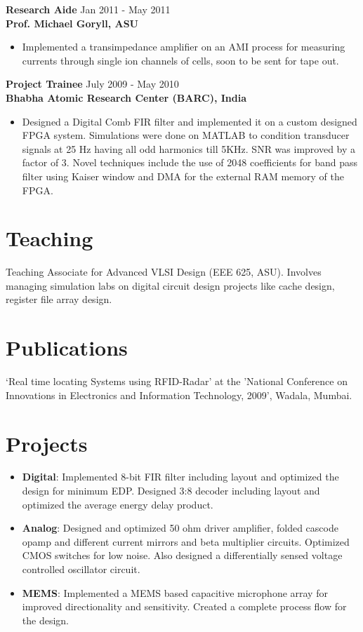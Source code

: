 \documentclass[margin]{res}
\begin{document}
\begin{resume}
{\bf Research Aide} \hfill Jan 2011 - May 2011\\
{\bf Prof. Michael Goryll, ASU}
\begin{itemize}
	\item Implemented a transimpedance amplifier on an AMI process for measuring currents through single ion channels of cells, soon to be sent for tape out.
\end{itemize}
 
{\bf Project Trainee} \hfill July 2009 - May 2010\\
{\bf Bhabha Atomic Research Center (BARC), India}
\begin{itemize} 
	\item Designed a Digital Comb FIR filter and implemented it on a custom designed FPGA system. Simulations were done on MATLAB to condition transducer signals at 25 Hz having all odd harmonics till 5KHz. SNR was improved by a factor of 3. Novel techniques include the use of 2048 coefficients for band pass filter using Kaiser window and DMA for the external RAM memory of the FPGA.
\end{itemize} 


\section{Teaching}
Teaching Associate for Advanced VLSI Design (EEE 625, ASU). Involves managing simulation labs on digital circuit design projects like cache design, register file array design.
\section{Publications}
‘Real time locating Systems using RFID-Radar’ at the 'National Conference on Innovations in Electronics and Information Technology, 2009', Wadala, Mumbai.

\section{Projects}
\begin{itemize}
\item
{\bf Digital}:  Implemented 8-bit FIR filter including layout and optimized the design for minimum EDP. Designed 3:8 decoder including layout and optimized the average energy delay product.
\item
{\bf Analog}: Designed and optimized 50 ohm driver amplifier, folded cascode opamp and different current mirrors and beta multiplier circuits. Optimized CMOS switches for low noise. Also designed a differentially sensed voltage controlled oscillator circuit.
\item
{\bf MEMS}: Implemented a MEMS based capacitive microphone array for improved directionality and sensitivity. Created a complete process flow for the design.
\end{itemize}


\end{resume}
\end{document}
